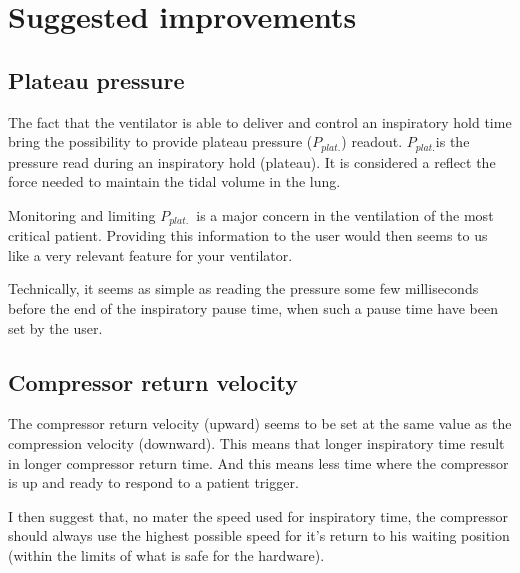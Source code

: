 \documentclass{nrepport}
\begin{document}
\section{Suggested improvements}

\subsection{Plateau pressure}

\def\pplat{$P_{plat.}$}

The fact that the ventilator is able to deliver and control an
inspiratory hold time bring the possibility to provide plateau
pressure (\pplat) readout. \pplat is the pressure read during an
inspiratory hold (plateau). It is considered a reflect the force
needed to maintain the tidal volume in the lung.

Monitoring and limiting \pplat\ is a major concern in the ventilation
of the most critical patient. Providing this information to the user
would then seems to us like a very relevant feature for your
ventilator.

Technically, it seems as simple as reading the pressure some few
milliseconds before the end of the inspiratory pause time, when such a
pause time have been set by the user.

\subsection{Compressor return velocity}

The compressor return velocity (upward) seems to be set at the same
value as the compression velocity (downward). This means that longer
inspiratory time result in longer compressor return time. And this
means less time where the compressor is up and ready to respond to a
patient trigger.

I then suggest that, no mater the speed used for inspiratory time, the
compressor should always use the highest possible speed for it's
return to his waiting position (within the
limits of what is safe for the hardware).
\end{document}
